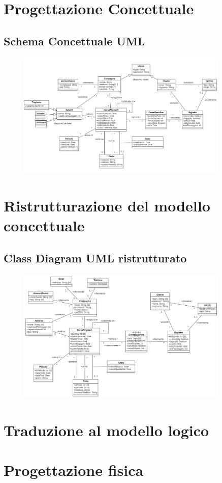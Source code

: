 \documentclass[a4paper, 12pt]{article}
\begin{document}


\tableofcontents
\newpage

\section{Progettazione Concettuale}

\newpage

\subsection{Schema Concettuale UML}
\begin{figure}[h!]
    \centering
    \includegraphics[width = 0.9\textwidth]{immagini/UMLdiagramNonRistrutturato.png}
    \label{UMLNonRistrutturato}
\end{figure}



\newpage

\section{Ristrutturazione del modello concettuale}

\newpage

\subsection{Class Diagram UML ristrutturato}
\begin{figure}[h!]
    \centering
    \includegraphics[width = 0.9\textwidth]{immagini/UMLdiagramRistrutturato.png}
    \label{UMLRistrutturato}
\end{figure}

\section{Traduzione al modello logico}

\newpage

\section{Progettazione fisica}

\end{document}

